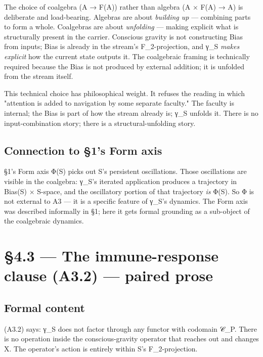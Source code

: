 \documentclass[11pt, openany]{book}
\newcommand{\sectionbreak}{\clearpage}
\begin{document}
The choice of coalgebra (A → F(A)) rather than algebra (A × F(A) → A) is deliberate and load-bearing. Algebras are about \textit{building up} --- combining parts to form a whole. Coalgebras are about \textit{unfolding} --- making explicit what is structurally present in the carrier. Conscious gravity is not constructing Bias from inputs; Bias is already in the stream's F\_\allowbreak{}2-projection, and γ\_\allowbreak{}S \textit{makes explicit} how the current state outputs it. The coalgebraic framing is technically required because the Bias is not produced by external addition; it is unfolded from the stream itself.

This technical choice has philosophical weight. It refuses the reading in which "attention is added to navigation by some separate faculty." The faculty is internal; the Bias is part of how the stream already is; γ\_\allowbreak{}S unfolds it. There is no input-combination story; there is a structural-unfolding story.

\subsection{Connection to §1's Form axis}

§1's Form axis Φ(S) picks out S's persistent oscillations. Those oscillations are visible in the coalgebra: γ\_\allowbreak{}S's iterated application produces a trajectory in Bias(S) × S-space, and the oscillatory portion of that trajectory \textit{is} Φ(S). So Φ is not external to A3 --- it is a specific feature of γ\_\allowbreak{}S's dynamics. The Form axis was described informally in §1; here it gets formal grounding as a sub-object of the coalgebraic dynamics.

\sectionbreak

\section{§4.3 --- The immune-response clause (A3.2) --- paired prose}

\subsection{Formal content}

(A3.2) says: γ\_\allowbreak{}S does not factor through any functor with codomain 𝒞\_\allowbreak{}P. There is no operation inside the conscious-gravity operator that reaches out and changes X. The operator's action is entirely within S's F\_\allowbreak{}2-projection.
\end{document}
